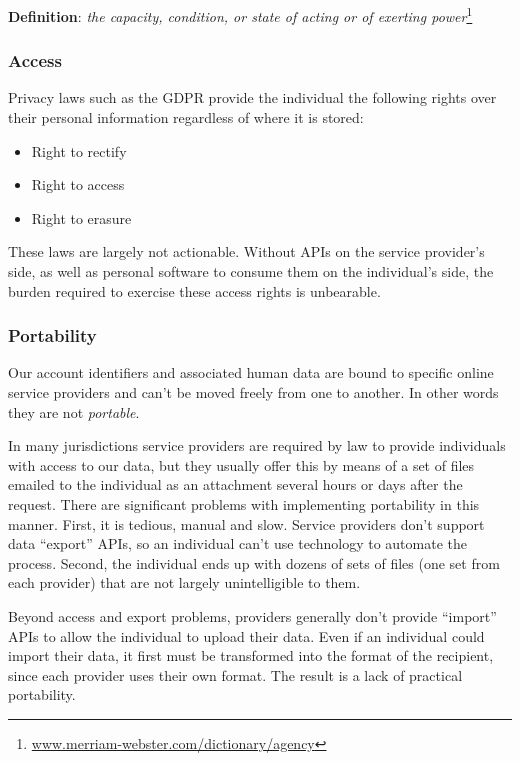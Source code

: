 \documentclass[11pt, oneside]{article}   	%
\newcommand{\hyperfootnote}[1][]{\def\ArgI{{#1}}\hyperfootnoteRelay}
\newcommand\hyperfootnoteRelay[2][]{\href{#1#2}{\ArgI}\footnote{\href{#1#2}{#2}}}
\begin{document}
\textbf{Definition}: \emph{the capacity, condition, or state of acting or of exerting power}\hyperfootnote[][https://]{www.merriam-webster.com/dictionary/agency}

\subsubsection{Access}

Privacy laws such as the GDPR provide the individual the following rights over their personal information regardless of where it is stored:
\begin{itemize}
	\item Right to rectify
	\item Right to access
	\item Right to erasure
\end{itemize}

These laws are largely not actionable. Without APIs on the service provider's side, as well as personal software to consume them on the individual's side, the burden required to exercise these access rights is unbearable.

\subsubsection{Portability}

Our account identifiers and associated human data are bound to specific online service providers and can't be moved freely from one to another. In other words they are not \emph{portable}.

In many jurisdictions service providers are required by law to provide individuals with access to our data, but they usually offer this by means of a set of files emailed to the individual as an attachment several hours or days after the request. There are significant problems with implementing portability in this manner. First, it is tedious, manual and slow. Service providers don't support data ``export'' APIs, so an individual can't use technology to automate the process. Second, the individual ends up with dozens of sets of files (one set from each provider) that are not largely unintelligible to them. 

Beyond access and export problems, providers generally don't provide ``import'' APIs to allow the individual to upload their data. Even if an individual could import their data, it first must be transformed into the format of the recipient, since each provider uses their own format. The result is a lack of practical portability.
\end{document}
